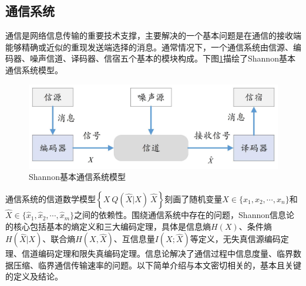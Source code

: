\subsection{通信系统}\label{sec:shannon_comunication_system}
通信是网络信息传输的重要技术支撑，主要解决的一个基本问题是在通信的接收端能够精确或近似的重现发送端选择的消息。通常情况下，一个通信系统由信源、编码器、噪声信道、译码器、信宿五个基本的模块构成\cite{shannon1948a}。下图\ref{fig:chapter03-communication-model}描绘了Shannon基本通信系统模型。
\begin{figure}[htbp]
	\centering
	\includegraphics[width = 0.65\linewidth]{./figures/chapter03_1.jpg}
	\caption{Shannon基本通信系统模型}
	\label{fig:chapter03-communication-model}
\end{figure}

通信系统的信道数学模型$\left\{X~ Q(\hat{X}|X)~\hat{X}\right\}$刻画了随机变量$X\in\{x_1,x_2,\cdots,x_n\}$和$\hat{X}\in\{\hat{x}_1,\hat{x}_2,\cdots,\hat{x}_m\}$之间的依赖性。围绕通信系统中存在的问题，Shannon信息论的核心包括基本的熵定义和三大编码定理，具体是信息熵$H(X)$、条件熵$H(\hat{X}|X)$、联合熵$H(X,\hat{X})$、互信息量$I(X;\hat{X})$等定义，无失真信源编码定理、信道编码定理和限失真编码定理\cite{shannon1948a,Shannon1959Coding,cover2006elements}。信息论解决了通信过程中信息度量、临界数据压缩、临界通信传输速率的问题。以下简单介绍与本文密切相关的，基本且关键的定义及结论。

